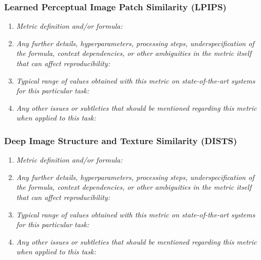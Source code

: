 \documentclass[a4paper,11pt]{article}
\begin{document}
        \subsubsection{Learned Perceptual Image Patch Similarity (LPIPS)}
            \begin{enumerate}[label=\alph*.]
                \item \textit{Metric definition and/or formula:}
                \bigskip
                \item \textit{Any further details, hyperparameters, processing steps, underspecification of the formula, context dependencies, or other ambiguities in the metric itself that can affect reproducibility:}
                \bigskip
                \item \textit{Typical range of values obtained with this metric on state-of-the-art systems for this particular task:}
                \bigskip
                \item \textit{Any other issues or subtleties that should be mentioned regarding this metric when applied to this task:}
                \bigskip
            \end{enumerate}
        \subsubsection{Deep Image Structure and Texture Similarity (DISTS)}
            \begin{enumerate}[label=\alph*.]
                \item \textit{Metric definition and/or formula:}
                \bigskip
                \item \textit{Any further details, hyperparameters, processing steps, underspecification of the formula, context dependencies, or other ambiguities in the metric itself that can affect reproducibility:}
                \bigskip
                \item \textit{Typical range of values obtained with this metric on state-of-the-art systems for this particular task:}
                \bigskip
                \item \textit{Any other issues or subtleties that should be mentioned regarding this metric when applied to this task:}
                \bigskip
            \end{enumerate}
\end{document}
